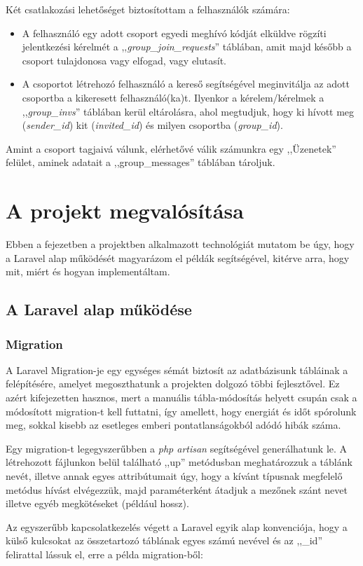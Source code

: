 \documentclass[
]{thesis-ekf}
\theoremstyle{definition}
\theoremstyle{remark}
\begin{document}
                Két csatlakozási lehetőséget biztosítottam a felhasználók számára:
                \begin{itemize}
                    \item A felhasználó egy adott csoport egyedi meghívó kódját elküldve rögzíti jelentkezési kérelmét a ,,\emph{group\_join\_requests}'' táblában, amit majd később a csoport tulajdonosa vagy elfogad, vagy elutasít.
                    \item A csoportot létrehozó felhasználó a kereső segítségével meginvitálja az adott csoportba a kikeresett felhasználó(ka)t. Ilyenkor a kérelem/kérelmek a ,,\emph{group\_invs}'' táblában kerül eltárolásra, ahol megtudjuk, hogy ki hívott meg (\emph{sender\_id}) kit (\emph{invited\_id}) és milyen csoportba (\emph{group\_id}).
                \end{itemize}

                Amint a csoport tagjaivá válunk, elérhetővé válik számunkra egy ,,Üzenetek'' felület, aminek adatait a ,,group\_messages'' táblában tároljuk.

        \chapter{A projekt megvalósítása}
        	Ebben a fejezetben a projektben alkalmazott technológiát mutatom be úgy, hogy a Laravel alap működését magyarázom el példák segítségével, kitérve arra, hogy mit, miért és hogyan implementáltam.
 
            \section{A Laravel alap működése}\label{Laravel-mukodes}
                \subsection{Migration}
                    A Laravel Migration-je\cite{Laravel-Migrations} egy egységes sémát biztosít az adatbázisunk tábláinak a felépítésére, amelyet megoszthatunk a projekten dolgozó többi fejlesztővel. Ez azért kifejezetten hasznos, mert a manuális tábla-módosítás helyett csupán csak a módosított migration-t kell futtatni, így amellett, hogy energiát és időt spórolunk meg, sokkal kisebb az esetleges emberi pontatlanságokból adódó hibák száma.

                    Egy migration-t legegyszerűbben a \emph{php artisan} segítségével generálhatunk le. A létrehozott fájlunkon belül található ,,up'' metódusban meghatározzuk a táblánk nevét, illetve annak egyes attribútumait úgy, hogy a kívánt típusnak megfelelő metódus hívást elvégezzük, majd paraméterként átadjuk a mezőnek szánt nevet illetve egyéb megkötéseket (például hossz).
                    
                    Az egyszerűbb kapcsolatkezelés végett a Laravel egyik alap konvenciója, hogy a külső kulcsokat az összetartozó táblának egyes számú nevével és az ,,\_id'' felirattal lássuk el, erre a példa migration-ből:
\end{document}
